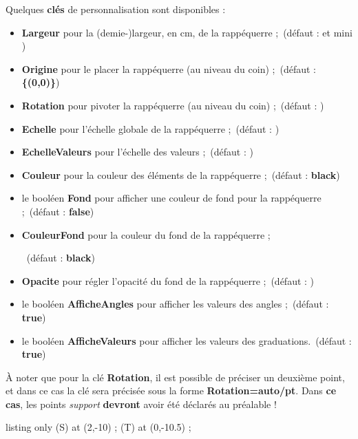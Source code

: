 \documentclass[french,a4paper,11pt]{article}
\newcommand\Cle[1]{{\bfseries\sffamily\textlangle #1\textrangle}}
\begin{document}
\begin{tipblock}
Quelques \Cle{clés} de personnalisation sont disponibles :

\begin{itemize}
	\item \Cle{Largeur} pour la (demie-)largeur, en cm, de la rappéquerre ;\hfill~(défaut : \Cle{6} et mini \Cle{3})
	\item \Cle{Origine} pour le placer la rappéquerre (au niveau du coin) ;\hfill~(défaut : \Cle{\{(0,0)\}})
	\item \Cle{Rotation} pour pivoter la rappéquerre (au niveau du coin) ;\hfill~(défaut : \Cle{0})
	\item \Cle{Echelle} pour l'échelle globale de la rappéquerre ;\hfill~(défaut : \Cle{1})
	\item \Cle{EchelleValeurs} pour l'échelle des valeurs ;\hfill~(défaut : \Cle{1})
	\item \Cle{Couleur} pour la couleur des éléments de la rappéquerre ;\hfill~(défaut : \Cle{black})
	\item le booléen \Cle{Fond} pour afficher une couleur de fond pour la rappéquerre ;\hfill~(défaut : \Cle{false})
	\item \Cle{CouleurFond} pour la couleur du fond de la rappéquerre ;
	
	\hfill~(défaut : \Cle{black})
	\item \Cle{Opacite} pour régler l'opacité du fond de la rappéquerre ;\hfill~(défaut : \Cle{0.5})
	\item le booléen \Cle{AfficheAngles} pour afficher les valeurs des angles ;\hfill~(défaut : \Cle{true})
	\item le booléen \Cle{AfficheValeurs} pour afficher les valeurs des graduations.\hfill~(défaut : \Cle{true})
\end{itemize}

À noter que pour la clé \Cle{Rotation}, il est possible de préciser un deuxième point, et dans ce cas la clé sera précisée sous la forme \Cle{Rotation=auto/pt}. Dans \textbf{ce cas}, les points \textit{support} \textbf{devront} avoir été déclarés au préalable !
\end{tipblock}

\begin{PresentationCode}{listing only}
\coordinate (S) at (2,-10) ;
\coordinate (T) at (0,-10.5) ;
\tkzRappEquerre[Origine={(-5,-9)},Rotation=150,Couleur=ForestGreen,Echelle=0.5,Ombre]
\tkzRappEquerre[Origine=S,Rotation=auto/T,Couleur=DarkBlue, Largeur=4,Fond,AfficheValeurs=false,AfficheAngles=false,CouleurFond=DarkBlue]
\end{PresentationCode}
\end{document}
